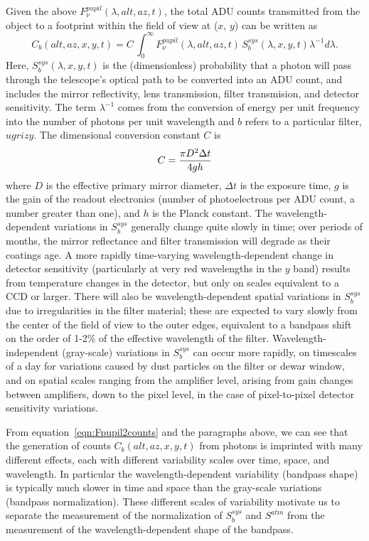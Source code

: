 \documentclass[12pt,preprint]{aastex}
\begin{document}
Given the above $F_\nu^{pupil}(\lambda,alt,az,t)$, the total ADU
counts transmitted from the object to a footprint within the field of
view at ($x$, $y$) can be written as
\begin{equation}
\label{eqn:Fpupil2counts}
    C_b(alt,az,x,y,t) = C \, \int_0^\infty {F_\nu^{pupil}(\lambda,alt,az,t) \, S_b^{sys}(\lambda,x,y,t) \lambda^{-1}d\lambda}.
\end{equation}
Here, $S_b^{sys}(\lambda,x,y,t)$ is the (dimensionless) probability
that a photon will pass through the telescope's optical path to be
converted into an ADU count, and 
includes the mirror reflectivity, lens transmission, filter
transmision, and detector sensitivity. The term
$\lambda^{-1}$ comes from the conversion of energy per unit frequency
into the number of photons per unit wavelength and $b$ refers to a particular filter, $ugrizy$. The
dimensional conversion constant $C$ is
\begin{equation}
\label{eqn:Cconstant}
        C = {\pi D^2 \Delta t \over 4 g h }  
\end{equation}
where $D$ is the effective primary mirror diameter, $\Delta t$ is the
exposure time, $g$ is the gain of the readout electronics (number of
photoelectrons per ADU count, a number greater than one), and $h$ is
the Planck constant. The wavelength-dependent variations in
$S_b^{sys}$ generally change quite slowly in time; over periods of
months, the mirror reflectance and filter transmission will degrade as
their coatings age. A more rapidly time-varying wavelength-dependent
change in detector sensitivity (particularly at very red wavelengths
in the $y$ band) results from temperature changes in the detector, but
only on scales equivalent to a CCD or larger.  There will also be
wavelength-dependent spatial variations in $S_b^{sys}$ due to
irregularities in the filter material; these are expected to vary
slowly from the center of the field of view to the outer edges,
equivalent to a bandpass shift on the order of 1-2\% of the effective
wavelength of the filter. Wavelength-independent (gray-scale)
variations in $S_b^{sys}$ can occur more rapidly, on timescales of a
day for variations caused by dust particles on the filter or dewar
window, and on spatial scales ranging from the amplifier level,
arising from gain changes between amplifiers, down to the pixel level,
in the case of pixel-to-pixel detector sensitivity variations.

From equation~\ref{eqn:Fpupil2counts} and the paragraphs above, we can
see that the generation of counts $C_b(alt,az,x,y,t)$ from photons is
imprinted with many different effects, each with different variability
scales over time, space, and wavelength. In particular the
wavelength-dependent variability (bandpass shape) is
typically much slower in time and space than the gray-scale variations
(bandpass normalization). These different scales of variability
motivate us to separate the measurement of the normalization of
$S_b^{sys}$ and $S^{atm}$ from the measurement of the
wavelength-dependent shape of the bandpass.
\end{document}
